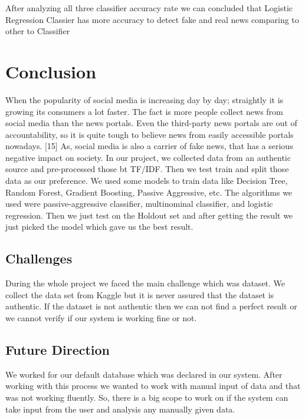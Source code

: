 \documentclass[conference]{IEEEtran}
\begin{document}
After analyzing all three classifier accuracy rate we can concluded that Logistic Regression Classier has more accuracy to detect fake and real news comparing to other to Classifier


\section{Conclusion}
When the popularity of social media is increasing day by day; straightly it is growing its consumers a lot faster. The fact is more people collect news from social media than the news portals. Even the third-party news portals are out of accountability, so it is quite tough to believe news from easily accessible portals nowadays. [15] As, social media is also a carrier of fake news, that has a serious negative impact on society. In our project, we collected data from an authentic source and pre-processed those bt TF/IDF. Then we test train and split those data as our preference. We used some models to train data like Decision Tree, Random Forest, Gradient Boosting, Passive Aggressive, etc. The algorithms we used were passive-aggressive classifier, multinominal classifier, and logistic regression. Then we just test on the Holdout set and after getting the result we just picked the model which gave us the best result. 


\subsection{Challenges}
During the whole project we faced the main challenge which was dataset. We collect the data set from Kaggle but it is never assured that the dataset is authentic. If the dataset is not authentic then we can not find a perfect result or we cannot verify if our system is working fine or not. 


\subsection{Future Direction}

We worked for our default database which was declared in our system. After working with this process we wanted to work with manual input of data and that was not working fluently. So, there is a big scope to work on if the system can take input from the user and analysis any manually given data. 

\vspace{12pt}
\vspace{12pt}
\vspace{12pt}
\end{document}
